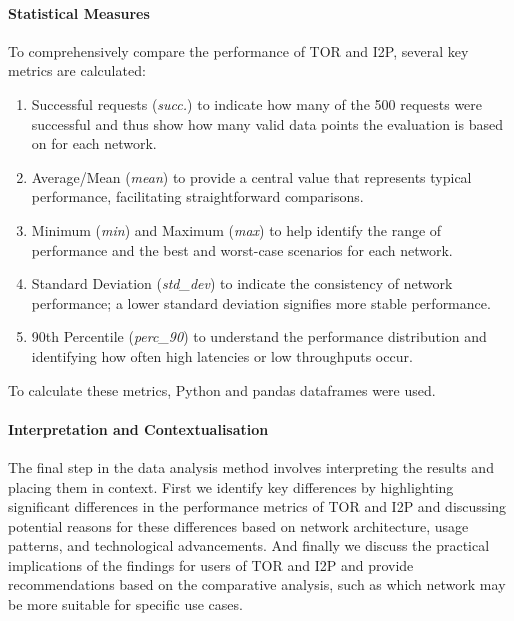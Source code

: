 \documentclass[12pt,conference]{IEEEtran}
\begin{document}
\paragraph{Statistical Measures}
To comprehensively compare the performance of TOR and I2P, several key metrics are calculated:
\begin{enumerate}
	\item Successful requests (\textit{succ.}) to indicate how many of the 500 requests were successful and thus show how many valid data points the evaluation is based on for each network.
	\item Average/Mean (\textit{mean}) to provide a central value that represents typical performance, facilitating straightforward comparisons.
	\item Minimum (\textit{min}) and Maximum (\textit{max}) to help identify the range of performance and the best and worst-case scenarios for each network.
	\item Standard Deviation (\textit{std\_dev}) to indicate the consistency of network performance; a lower standard deviation signifies more stable performance.
	\item 90th Percentile (\textit{perc\_90}) to understand the performance distribution and identifying how often high latencies or low throughputs occur.
\end{enumerate}
To calculate these metrics, Python and pandas dataframes were used.
\paragraph{Interpretation and Contextualisation}
The final step in the data analysis method involves interpreting the results and placing them in context. First we identify key differences by highlighting significant differences in the performance metrics of TOR and I2P and discussing potential reasons for these differences based on network architecture, usage patterns, and technological advancements. And finally we discuss the practical implications of the findings for users of TOR and I2P and provide recommendations based on the comparative analysis, such as which network may be more suitable for specific use cases.
\end{document}
